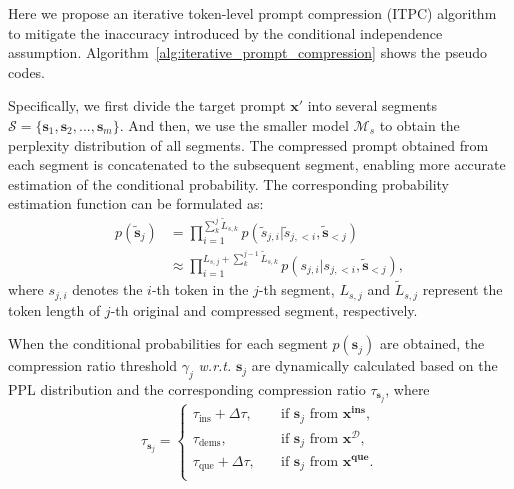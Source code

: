 
Here we propose an iterative token-level prompt compression (ITPC) algorithm to mitigate the inaccuracy introduced by the conditional independence assumption. Algorithm~\ref{alg:iterative_prompt_compression} shows the pseudo codes.

Specifically, we first divide the target prompt $\bm{x}'$ into several segments $\mathcal{S}=\{\bm{s}_1, \bm{s}_2, ..., \bm{s}_m\}$.
And then, we use the %
smaller model $\mathcal{M}_s$ to obtain the perplexity distribution of all segments.
The compressed prompt obtained from each segment %
is concatenated to the subsequent segment, enabling more accurate estimation of the conditional probability.
The corresponding probability estimation function can be formulated as:
\begin{equation}
\begin{aligned}
p(\bm{\widetilde{s}}_j) &= \prod_{i=1}^{\sum_k^{j}\widetilde{L}_{s,k}} p(\widetilde{s}_{j, i}|\widetilde{s}_{j,<i}, \bm{\widetilde{s}}_{<j}) 	\\
&\approx \prod_{i=1}^{L_{s,j} + \sum_k^{j-1}\widetilde{L}_{s,k}} p(s_{j,i}|s_{j,<i}, \bm{\widetilde{s}}_{<j}),
\end{aligned}
\label{eq:prompt_ppl_iterative}
\end{equation}
where $s_{j,i}$ denotes the $i$-th token in the $j$-th segment, $L_{s, j}$ and $\widetilde{L}_{s, j}$ represent the token length of $j$-th original and compressed segment, respectively.

When the conditional probabilities for each segment $p(\bm{s}_j)$ are obtained, the compression ratio threshold $\gamma_j$ \textit{w.r.t.} $\bm{s}_j$ are dynamically calculated based on the PPL distribution and the corresponding compression ratio $\tau_{\bm{s}_j}$, where
\begin{equation}
\tau_{\bm{s}_j} =\left\{
\begin{aligned}
\tau_{\text{ins}} + \Delta\tau, &\quad \text{if $\bm{s}_j$ from $\bm{x^{\text{ins}}}$}, \\
\tau_{\text{dems}}, &\quad \text{if $\bm{s}_j$ from $\bm{x^{\mathcal{D}}}$},\\
\tau_{\text{que}} + \Delta\tau, &\quad \text{if $\bm{s}_j$ from $\bm{x^{\text{que}}}$}.\\
\end{aligned}
\right.
\label{eq:tau_for_gamma}
\end{equation}

